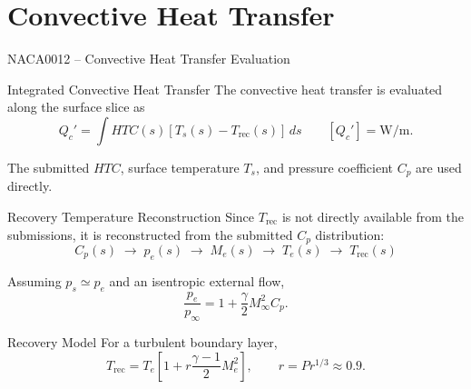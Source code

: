 
\section[HTC]{\textbf{Convective Heat Transfer}}



\begin{frame}[shrink=15]{\small NACA0012 -- Convective Heat Transfer Evaluation}
\scriptsize

\centering

\begin{minipage}{0.90\textwidth}
\begin{block}{\scriptsize Integrated Convective Heat Transfer}
The convective heat transfer is evaluated along the surface slice as
\[
\boxed{
Q_c'
=
\int
HTC(s)
\left[
T_s(s)-T_{\mathrm{rec}}(s)
\right]\,ds
}
\qquad
[Q_c'] = \mathrm{W/m}.
\]

The submitted $HTC$, surface temperature $T_s$, and pressure coefficient $C_p$
are used directly.
\end{block}
\end{minipage}

\vspace{0.15cm}

\begin{minipage}{0.90\textwidth}
\begin{block}{\scriptsize Recovery Temperature Reconstruction}
Since $T_{\mathrm{rec}}$ is not directly available from the submissions, it is
reconstructed from the submitted $C_p$ distribution:
\[
\boxed{
C_p(s)
\;\longrightarrow\;
p_e(s)
\;\longrightarrow\;
M_e(s)
\;\longrightarrow\;
T_e(s)
\;\longrightarrow\;
T_{\mathrm{rec}}(s)
}
\]

Assuming $p_s \simeq p_e$ and an isentropic external flow,
\[
\frac{p_e}{p_\infty}
=
1+\frac{\gamma}{2}M_\infty^2 C_p.
\]
\end{block}
\end{minipage}

\vspace{0.15cm}

\begin{minipage}{0.90\textwidth}
\begin{block}{\scriptsize Recovery Model}
For a turbulent boundary layer,
\[
T_{\mathrm{rec}}
=
T_e
\left[
1+r\frac{\gamma-1}{2}M_e^2
\right],
\qquad
r=Pr^{1/3}\approx0.9.
\]
\end{block}
\end{minipage}

\end{frame}


